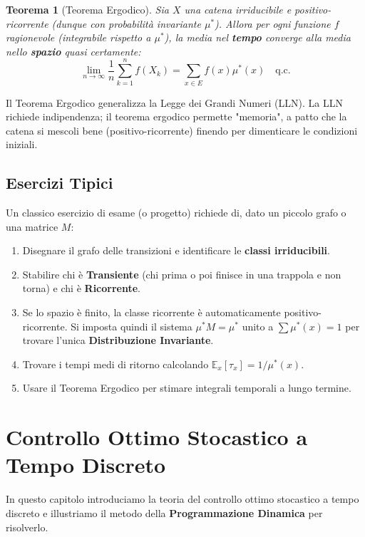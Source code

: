 \documentclass[11pt, a4paper]{report}
\theoremstyle{plain}
\newtheorem{theorem}{Teorema}[chapter]
\theoremstyle{definition}
\theoremstyle{remark}
\newcommand{\E}{\mathbb{E}}
\newcommand{\1}{\mathbf{1}}
\begin{document}
\begin{theorem}[Teorema Ergodico]
Sia $X$ una catena irriducibile e positivo-ricorrente (dunque con probabilità invariante $\mu^*$). Allora per ogni funzione $f$ ragionevole (integrabile rispetto a $\mu^*$), la media nel \textbf{tempo} converge alla media nello \textbf{spazio} quasi certamente:
\[ \lim_{n \to \infty} \frac{1}{n} \sum_{k=1}^n f(X_k) = \sum_{x \in E} f(x) \mu^*(x) \quad \text{q.c.} \]
\end{theorem}

Il Teorema Ergodico generalizza la Legge dei Grandi Numeri (LLN). La LLN richiede indipendenza; il teorema ergodico permette "memoria", a patto che la catena si mescoli bene (positivo-ricorrente) finendo per dimenticare le condizioni iniziali.

\section{Esercizi Tipici}

Un classico esercizio di esame (o progetto) richiede di, dato un piccolo grafo o una matrice $M$:
\begin{enumerate}
    \item Disegnare il grafo delle transizioni e identificare le \textbf{classi irriducibili}.
    \item Stabilire chi è \textbf{Transiente} (chi prima o poi finisce in una trappola e non torna) e chi è \textbf{Ricorrente}.
    \item Se lo spazio è finito, la classe ricorrente è automaticamente positivo-ricorrente. Si imposta quindi il sistema $\mu^* M = \mu^*$ unito a $\sum \mu^*(x) = 1$ per trovare l'unica \textbf{Distribuzione Invariante}.
    \item Trovare i tempi medi di ritorno calcolando $\E_x[\tau_x] = 1 / \mu^*(x)$.
    \item Usare il Teorema Ergodico per stimare integrali temporali a lungo termine.
\end{enumerate}



\chapter{Controllo Ottimo Stocastico a Tempo Discreto}

In questo capitolo introduciamo la teoria del controllo ottimo stocastico a tempo discreto e illustriamo il metodo della \textbf{Programmazione Dinamica} per risolverlo.
\end{document}
